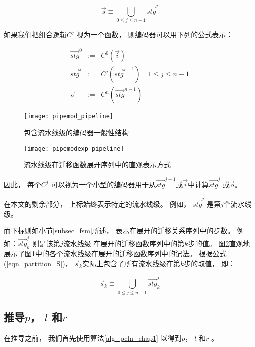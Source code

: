\begin{equation}\label{eqn_partition_S}
\vec{s}\equiv \bigcup _{0\le j\le n-1} \vec{stg}^j
\end{equation}

如果我们把组合逻辑$C^j$ 视为一个函数，
则编码器可以用下列的公式表示：

\begin{equation}\label{equ_genpipe}
\begin{array}{cccc}
\vec{stg}^0   & := & C^0(\vec{i})         &\\
\vec{stg}^j   & := & C^j(\vec{stg}^{j-1}) & 1\le j\le n-1\\
\vec{o}       & := & C^n(\vec{stg}^{n-1}) &
\end{array}
\end{equation}


\begin{figure}[t]
\begin{center}
\texttt{[image: pipemod\_pipeline]}
\end{center}
\caption{包含流水线级的编码器一般性结构}
  \label{fig_pipeenc_chap4}
\end{figure}

\begin{figure}[b]
\begin{center}
\texttt{[image: pipemodexp\_pipeline]}
\end{center}
\caption{流水线级在迁移函数展开序列中的直观表示方式}
  \label{fig_pipeencexp_chap4}
\end{figure}


因此，
每个$C^j$ 可以视为一个小型的编码器用于从$\vec{stg}^{j-1}$或$\vec{i}$中计算$\vec{stg}^j$ 或$\vec{o}$。


在本文的剩余部分，
上标始终表示特定的流水线级。
例如，
$\vec{stg}^j$ 是第$j$个流水线级。

而下标则如小节\ref{subsec_fsm}所述，
表示在展开的迁移关系序列中的步数。
例如：$\vec{stg}^j_k$ 则是该第$j$流水线级
在展开的迁移函数序列中的第$k$步的值。
图\ref{fig_pipeencexp_chap4}直观地展示了图\ref{fig_pipeenc_chap4}中的各个流水线级在展开的迁移函数序列中的记法。
根据公式(\ref{eqn_partition_S})，
$\vec{s}_k$实际上包含了所有流水线级在第$k$步的取值，
即：

\begin{equation}\label{eqn_partition_Sk}
\vec{s}_k\equiv \bigcup _{0\le j\le n-1} \vec{stg}^j_k
\end{equation}

\subsection{推导$p$， $l$ 和$r$}\label{subsec_inferplr}
在推导之前，
我们首先使用算法\ref{alg_pcln_chap1} 以得到$p$， $l$ 和$r$ 。

